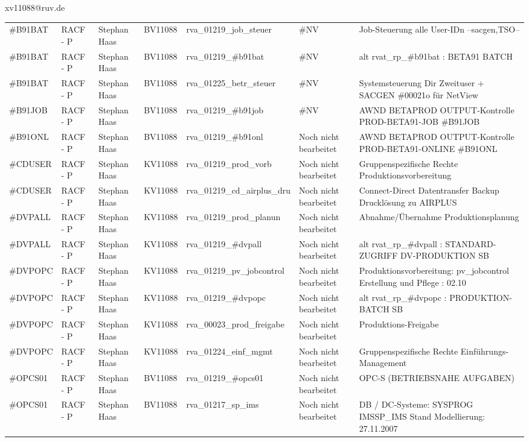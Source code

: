 \documentclass[a4paper,landscape,12pt]{letter}
\begin{document}
\begin{letter}{xv11088@ruv.de\hfill \break}
\begin{tiny}
\begin{longtable}{|p{35mm}|p{15mm}|p{25mm}|p{10mm}|p{40mm}|p{50mm}|p{50mm}|}
\#B91BAT & RACF - P & Stephan Haas & BV11088 & rva\_01219\_job\_steuer & \#NV & Job-Steuerung alle User-IDn --sacgen,TSO-- \\
\#B91BAT & RACF - P & Stephan Haas & BV11088 & rva\_01219\_\#b91bat & \#NV & alt rvat\_rp\_\#b91bat          : BETA91 BATCH \\
\#B91BAT & RACF - P & Stephan Haas & BV11088 & rva\_01225\_betr\_steuer & \#NV & Systemsteuerung Dir Zweituser + SACGEN \#00021o für NetView \\
\#B91JOB & RACF - P & Stephan Haas & BV11088 & rva\_01219\_\#b91job & \#NV & AWND BETAPROD OUTPUT-Kontrolle PROD-BETA91-JOB \#B91JOB \\
\#B91ONL & RACF - P & Stephan Haas & BV11088 & rva\_01219\_\#b91onl & Noch nicht bearbeitet & AWND BETAPROD OUTPUT-Kontrolle PROD-BETA91-ONLINE \#B91ONL \\
\#CDUSER & RACF - P & Stephan Haas & KV11088 & rva\_01219\_prod\_vorb & Noch nicht bearbeitet & Gruppenspezifische Rechte Produktionsvorbereitung \\
\#CDUSER & RACF - P & Stephan Haas & KV11088 & rva\_01219\_cd\_airplus\_dru & Noch nicht bearbeitet & Connect-Direct Datentransfer Backup Drucklösung zu AIRPLUS \\
\#DVPALL & RACF - P & Stephan Haas & KV11088 & rva\_01219\_prod\_planun & Noch nicht bearbeitet & Abnahme/Übernahme Produktionsplanung \\
\#DVPALL & RACF - P & Stephan Haas & KV11088 & rva\_01219\_\#dvpall & Noch nicht bearbeitet & alt rvat\_rp\_\#dvpall          : STANDARD-ZUGRIFF DV-PRODUKTION SB \\
\#DVPOPC & RACF - P & Stephan Haas & KV11088 & rva\_01219\_pv\_jobcontrol & Noch nicht bearbeitet & Produktionsvorbereitung: pv\_jobcontrol Erstellung und Pflege : 02.10 \\
\#DVPOPC & RACF - P & Stephan Haas & KV11088 & rva\_01219\_\#dvpopc & Noch nicht bearbeitet & alt rvat\_rp\_\#dvpopc          : PRODUKTION-BATCH SB \\
\#DVPOPC & RACF - P & Stephan Haas & KV11088 & rva\_00023\_prod\_freigabe & Noch nicht bearbeitet & Produktions-Freigabe \\
\#DVPOPC & RACF - P & Stephan Haas & KV11088 & rva\_01224\_einf\_mgmt & Noch nicht bearbeitet & Gruppenspezifische Rechte Einführungs-Management \\
\#OPCS01 & RACF - P & Stephan Haas & BV11088 & rva\_01219\_\#opcs01 & Noch nicht bearbeitet & OPC-S (BETRIEBSNAHE AUFGABEN) \\
\#OPCS01 & RACF - P & Stephan Haas & BV11088 & rva\_01217\_sp\_ims & Noch nicht bearbeitet & DB / DC-Systeme:  SYSPROG IMSSP\_IMS Stand Modellierung: 27.11.2007 \\

\end{longtable}
\end{tiny}
\end{letter}
\end{document}
